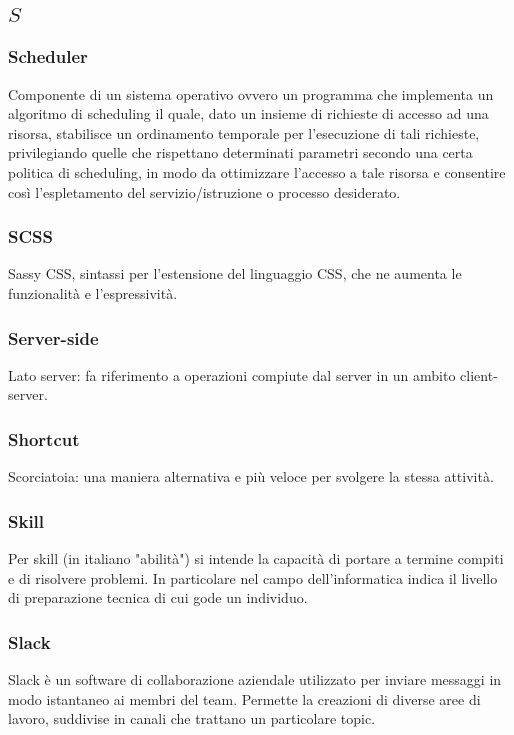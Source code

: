 \subsection*{\quad$S\quad$}
\subsubsection*{Scheduler}
Componente di un sistema operativo ovvero un programma che implementa un algoritmo di scheduling il quale, dato un insieme di richieste di accesso ad una risorsa, stabilisce un ordinamento temporale per l'esecuzione di tali richieste, privilegiando quelle che rispettano determinati parametri secondo una certa politica di scheduling, in modo da ottimizzare l'accesso a tale risorsa e consentire così l'espletamento del servizio/istruzione o processo desiderato.

\subsubsection*{SCSS}
Sassy CSS, sintassi per l'estensione del linguaggio CSS, che ne aumenta le funzionalità e l'espressività.

\subsubsection*{Server-side}
Lato server: fa riferimento a operazioni compiute dal server in un ambito client-server. 

\subsubsection*{Shortcut}
Scorciatoia: una maniera alternativa e più veloce per svolgere la stessa attività.

\subsubsection*{Skill}
Per skill (in italiano "abilità") si intende la capacità di portare a termine compiti e di risolvere problemi. In particolare nel campo dell'informatica indica il livello di preparazione tecnica di cui gode un individuo.

\subsubsection*{Slack}
Slack è un software di collaborazione aziendale utilizzato per inviare messaggi in modo istantaneo ai membri del team. Permette la creazioni di diverse aree di lavoro, suddivise in canali che trattano un particolare topic.

